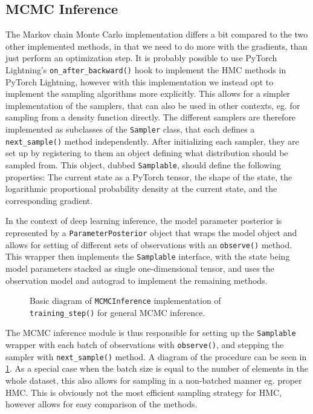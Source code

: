 \subsection{MCMC Inference}
The Markov chain Monte Carlo implementation differs a bit compared to the two other implemented methods, in that we need to do more with the gradients, than just perform an optimization step. 
It is probably possible to use PyTorch Lightning's \texttt{on\_after\_backward()} hook to implement the HMC methods in PyTorch Lightning, however with this implementation we instead opt to implement the sampling algorithms more explicitly.
This allows for a simpler implementation of the samplers, that can also be used in other contexts, eg. for sampling from a density function directly.
The different samplers are therefore implemented as  subclasses of the \texttt{Sampler} class, that each defines a \texttt{next\_sample()} method independently.
After initializing each sampler, they are set up by registering to them an object defining what distribution should be sampled from. 
This object, dubbed \texttt{Samplable}, should define the following properties: The current state as a PyTorch tensor, the shape of the state, the logarithmic proportional probability density at the current state, and the corresponding gradient.  

In the context of deep learning inference, the model parameter posterior is represented by a \texttt{ParameterPosterior} object that wraps the model object and allows for setting of different sets of observations with an \texttt{observe()} method.
This wrapper then implements the \texttt{Samplable} interface, with the state being model parameters stacked as single one-dimensional tensor, and uses the observation model and autograd to implement the remaining methods.
\begin{figure}[htbp]
    \centering
    
    \caption{Basic diagram of \texttt{MCMCInference} implementation of \texttt{training\_step()} for general MCMC inference.}
    \label{fig:mcmc-arch}
\end{figure}
The MCMC inference module is thus responsible for setting up the \texttt{Samplable} wrapper with each batch of observations with \texttt{observe()}, and stepping the sampler with \texttt{next\_sample()} method. 
A diagram of the procedure can be seen in \cref{fig:mcmc-arch}.
As a special case when the batch size is equal to the number of elements in the whole dataset, this also allows for sampling in a non-batched manner eg. proper HMC.
This is obviously not the most efficient sampling strategy for HMC, however allows for easy comparison of the methods.

